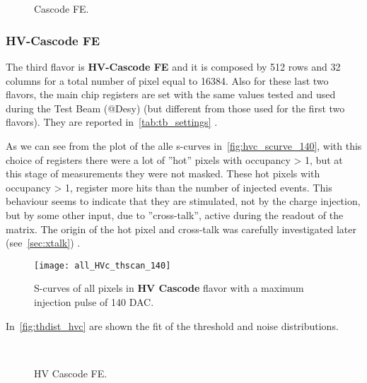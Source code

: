 \begin{figure}[h!]
\centering
{}\quad
{}\\
\quad
{}\\
\caption{Cascode FE.}
\label{fig:thdist_casc}
\end{figure}



\subsubsection{HV-Cascode FE}


The third flavor is \textbf{HV-Cascode FE} and it is composed by 512 rows and 32 columns for a total number of pixel equal to 16384. Also for these last two flavors, the main chip registers are set with the same values tested and used during the Test Beam (@Desy) (but different from those used for the first two flavors). They are reported in~\autoref{tab:tb_settings} .

As we can see from the plot of the alle s-curves in~\autoref{fig:hvc_scurve_140}, with this choice of registers there were a lot of ''hot'' pixels with occupancy > 1, but at this stage of measurements they were not masked.
These hot pixels with occupancy > 1, register more hits than the number of injected events. This behaviour seems to indicate that they are stimulated, not by the charge injection, but by some other input, due to ''cross-talk'', active during the readout of the matrix. The origin of the hot pixel and cross-talk was carefully investigated later (see~\autoref{sec:xtalk})
.

\begin{figure}[h!]
\centering
\texttt{[image: all\_HVc\_thscan\_140]}
\caption{S-curves of all pixels in \textbf{HV Cascode} flavor with a maximum injection pulse of 140 DAC.}
\label{fig:hvc_scurve_140}
\end{figure}

In~\autoref{fig:thdist_hvc} are shown the fit of the threshold and noise distributions.

\begin{figure}[h!]
\centering
{}\quad
{}\\
\caption{HV Cascode FE.}
\label{fig:thdist_hvc}
\end{figure}


